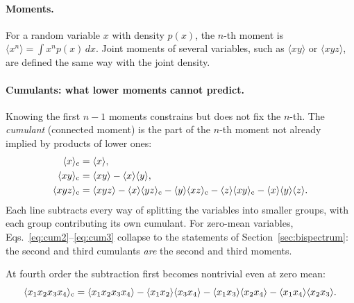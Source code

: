 \documentclass[11pt]{article}
\numberwithin{equation}{section}
\begin{document}
\paragraph{Moments.}
For a random variable $x$ with density $p(x)$, the $n$-th moment is
$\langle x^n\rangle = \int x^n p(x)\, dx$.  Joint moments of several
variables, such as $\langle xy\rangle$ or $\langle xyz\rangle$, are
defined the same way with the joint density.

\paragraph{Cumulants: what lower moments cannot predict.}
Knowing the first $n-1$ moments constrains but does not fix the
$n$-th.  The \emph{cumulant} (connected moment) is the part of the
$n$-th moment not already implied by products of lower ones:
\begin{align}
  \langle x \rangle_{\rm c} &= \langle x \rangle ,
  \label{eq:cum1}\\
  \langle x y \rangle_{\rm c}
  &= \langle x y \rangle - \langle x\rangle\langle y\rangle ,
  \label{eq:cum2}\\
  \langle x y z \rangle_{\rm c}
  &= \langle x y z \rangle
  - \langle x\rangle\langle y z\rangle_{\rm c}
  - \langle y\rangle\langle x z\rangle_{\rm c}
  - \langle z\rangle\langle x y\rangle_{\rm c}
  - \langle x\rangle\langle y\rangle\langle z\rangle .
  \label{eq:cum3}
\end{align}
Each line subtracts every way of splitting the variables into
smaller groups, with each group contributing its own cumulant.  For
zero-mean variables, Eqs.~\eqref{eq:cum2}--\eqref{eq:cum3} collapse
to the statements of Section~\ref{sec:bispectrum}: the second and
third cumulants \emph{are} the second and third moments.

At fourth order the subtraction first becomes nontrivial even at
zero mean:
\begin{equation}
  \langle x_1 x_2 x_3 x_4 \rangle_{\rm c}
  = \langle x_1 x_2 x_3 x_4 \rangle
  - \langle x_1 x_2\rangle\langle x_3 x_4\rangle
  - \langle x_1 x_3\rangle\langle x_2 x_4\rangle
  - \langle x_1 x_4\rangle\langle x_2 x_3\rangle .
  \label{eq:cum4}
\end{equation}
\end{document}
